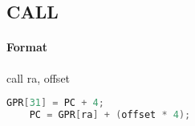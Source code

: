 \subsection{CALL}


\paragraph{Format} call ra, offset

\begin{lstlisting}[language=c]
    GPR[31] = PC + 4;
    PC = GPR[ra] + (offset * 4);
\end{lstlisting}